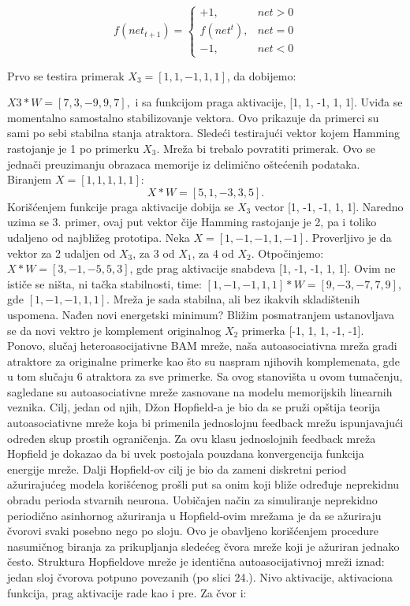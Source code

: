 \documentclass[fontsize=11bp, paper=a4]{scrarticle}
\begin{document}
$$ 
f( net_{ t + 1 } ) = \begin{cases}
    +1,&        net>0\\
    f(net^t),&  net=0\\
    -1,&        net<0
\end{cases}
$$

Prvo se testira primerak  $X_3 = [1, 1, -1, 1, 1]$, da dobijemo:

$X3 * W = [7, 3, -9, 9, 7],$ i sa funkcijom praga aktivacije, [1, 1, -1, 1, 1]. Uviđa se momentalno samostalno stabilizovanje vektora. Ovo prikazuje da primerci su sami po sebi stabilna stanja atraktora. Sledeći testirajući vektor kojem Hamming rastojanje je 1 po primerku $X_3$. Mreža bi trebalo povratiti primerak. Ovo se jednači preuzimanju obrazaca memorije iz delimično oštećenih podataka. Biranjem $X=[1,1,1,1,1]$:
$$X * W = [5, 1, -3, 3, 5].$$
Korišćenjem funkcije praga aktivacije dobija se $X_3$ vector [1, -1, -1, 1, 1]. Naredno uzima se 3. primer, ovaj put vektor čije Hamming rastojanje je 2, pa i toliko udaljeno od najbližeg prototipa. Neka $X=[1,-1,-1, 1, -1]$. Proverljivo je da vektor za 2 udaljen od $X_3$, za 3 od $X_1$, za 4 od $X_2$. Otpočinjemo:
$X * W = [3, -1, -5, 5, 3]$, gde prag aktivacije snabdeva [1, -1, -1, 1, 1].
Ovim ne ističe se ništa, ni tačka stabilnosti, time:
$[1, -1, -1, 1, 1] * W = [9, -3, -7, 7, 9]$, gde $[1, -1, -1, 1, 1]$.
Mreža je sada stabilna, ali bez ikakvih skladištenih uspomena. Nađen novi energetski minimum? Bližim posmatranjem ustanovljava se da novi vektro je komplement originalnog $X_2$ primerka [-1, 1, 1, -1, -1]. Ponovo, slučaj heteroasocijativne BAM mreže, naša autoasociativna mreža gradi atraktore za originalne primerke kao što su naspram njihovih komplemenata, gde u tom slučaju 6 atraktora za sve primerke.
Sa ovog stanovišta u ovom tumačenju, sagledane su autoasociativne mreže zasnovane na modelu memorijskih linearnih veznika. Cilj, jedan od njih, Džon Hopfield-a je bio da se pruži opštija teorija autoasociativne mreže koja bi primenila jednoslojnu feedback mrežu ispunjavajući određen skup prostih ograničenja. Za ovu klasu jednoslojnih feedback mreža Hopfield je dokazao da bi uvek postojala pouzdana konvergencija funkcija energije mreže. Dalji Hopfield-ov cilj je bio da zameni diskretni period ažurirajućeg modela korišćenog prošli put sa onim koji bliže određuje neprekidnu obradu perioda stvarnih neurona. Uobičajen način za simuliranje neprekidno periodično asinhornog ažuriranja u Hopfield-ovim mrežama je da se ažuriraju čvorovi svaki posebno nego po sloju. Ovo je obavljeno korišćenjem procedure nasumičnog biranja za prikupljanja sledećeg čvora mreže koji je ažuriran jednako često. Struktura Hopfieldove mreže je identična autoasocijativnoj mreži iznad: jedan sloj čvorova potpuno povezanih (po slici 24.). Nivo aktivacije, aktivaciona funkcija, prag aktivacije rade kao i pre. Za čvor i:
\end{document}
